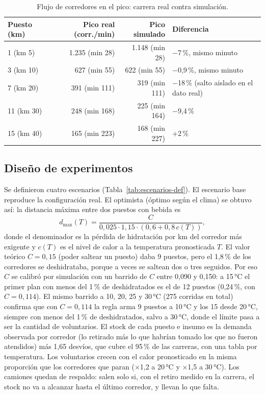 \documentclass[11pt,a4paper]{article}
\begin{document}
\begin{table}[H]
\centering
\small
\begin{tabular}{lrrl}
\toprule
\textbf{Puesto (km)} & \textbf{Pico real (corr./min)} & \textbf{Pico simulado} & \textbf{Diferencia} \\
\midrule
1 (km 5) & 1.235 (min 28) & 1.148 (min 28) & $-$7\,\%, mismo minuto \\
3 (km 10) & 627 (min 55) & 622 (min 55) & $-$0,9\,\%, mismo minuto \\
7 (km 20) & 391 (min 111) & 319 (min 111) & $-$18\,\% (salto aislado en el dato real) \\
11 (km 30) & 248 (min 168) & 225 (min 164) & $-$9,4\,\% \\
15 (km 40) & 165 (min 223) & 168 (min 227) & +2\,\% \\
\bottomrule
\end{tabular}
\caption{Flujo de corredores en el pico: carrera real contra simulación.}
\label{tab:validacion}
\end{table}

\subsection{Diseño de experimentos}

Se definieron cuatro escenarios (Tabla~\ref{tab:escenarios-def}). El escenario base reproduce la configuración real. El optimista (óptimo según el clima) se obtuvo así: la distancia máxima entre dos puestos con bebida es
\begin{equation}
    d_{\max}(T) = \frac{C}{0{,}025 \cdot 1{,}15 \cdot \left(0{,}6 + 0{,}8\,c(T)\right)},
\end{equation}
donde el denominador es la pérdida de hidratación por km del corredor más exigente y $c(T)$ es el nivel de calor a la temperatura pronosticada $T$. El valor teórico $C = 0{,}15$ (poder saltear un puesto) daba 9 puestos, pero el 1,8\,\% de los corredores se deshidrataba, porque a veces se saltean dos o tres seguidos. Por eso $C$ se calibró por simulación con un barrido de $C$ entre 0,090 y 0,150: a 15\,°C el primer plan con menos del 1\,\% de deshidratados es el de 12 puestos (0,24\,\%, con $C = 0{,}114$). El mismo barrido a 10, 20, 25 y 30\,°C (275 corridas en total) confirma que con $C = 0{,}114$ la regla arma 9 puestos a 10\,°C y los 15 desde 20\,°C, siempre con menos del 1\,\% de deshidratados, salvo a 30\,°C, donde el límite pasa a ser la cantidad de voluntarios. El stock de cada puesto e insumo es la demanda observada por corredor (lo retirado más lo que habrían tomado los que no fueron atendidos) más 1,65 desvíos, que cubre el 95\,\% de las carreras, con una tabla por temperatura. Los voluntarios crecen con el calor pronosticado en la misma proporción que los corredores que paran ($\times$1,2 a 20\,°C y $\times$1,5 a 30\,°C). Los camiones quedan de respaldo: salen solo si, con el retiro medido en la carrera, el stock no va a alcanzar hasta el último corredor, y llevan lo que falta.
\end{document}
